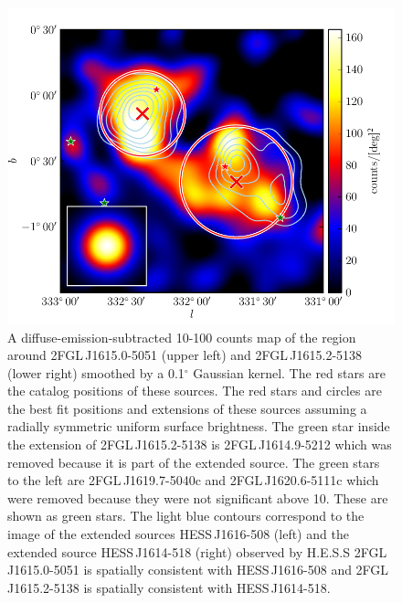 \documentclass[12pt,preprint]{aastex}
\newcommand{\gev}{\text{GeV}\xspace}
\newcommand{\tev}{\text{TeV}\xspace}
\renewcommand{\deg}{\ensuremath{^\circ}\xspace}
\begin{document}
\begin{figure}
  \begin{center}
    \includegraphics[type=pdf,ext=.pdf,read=.pdf]{source_plots/source_1FGL_J1613.6-5100c}
  \end{center}
  \caption{
    A diffuse-emission-subtracted 10-100
    \gev counts map of the region around 2FGL\,J1615.0-5051 (upper
    left) and 2FGL\,J1615.2-5138 (lower right) smoothed by a 0.1\deg
    Gaussian kernel.  The red stars are the catalog positions of these
    sources.  The red stars and circles are the best fit positions and
    extensions of these sources 
    assuming a radially
    symmetric uniform surface brightness.
    The green star inside the extension of 2FGL\,J1615.2-5138  is
    2FGL\,J1614.9-5212 which was removed because it is part of the
    extended source.  The green stars to the left are 2FGL\,J1619.7-5040c
    and 2FGL\,J1620.6-5111c which were removed because they were
    not significant above 10\gev. These are shown as green stars.
    The light blue
    contours correspond to the \tev image 
    of the extended sources
    HESS\,J1616-508 (left) and the extended source HESS\,J1614-518
    (right)
    observed by H.E.S.S
    \citep{hess_plane_survey}
    2FGL\,J1615.0-5051 is spatially consistent with HESS\,J1616-508 and
    2FGL\,J1615.2-5138 is spatially consistent with HESS\,J1614-518.
  }\label{1FGL_J1613.6-5100c}
\end{figure}
\end{document}

